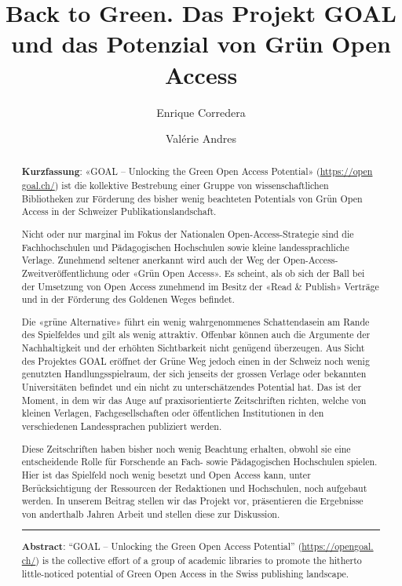 \documentclass[a4paper,
fontsize=11pt,
oneside,
numbers=noperiodatend,
parskip=half-,
bibliography=totoc,
final
]{scrartcl}
\title{\LARGE{Back to Green. Das Projekt GOAL und das Potenzial von Grün Open Access}}%
\author{Enrique Corredera \and Valérie Andres} %
\date{}
\begin{document}
\maketitle
\thispagestyle{fancyplain} 

\begin{abstract}
\noindent
\textbf{Kurzfassung}: «GOAL -- Unlocking the Green Open Access
Potential» (\href{https://opengoal.ch/}{https://open goal.ch/}) ist die kollektive Bestrebung
einer Gruppe von wissenschaftlichen Bibliotheken zur Förderung des
bisher wenig beachteten Potentials von Grün Open Access in der Schweizer
Publikationslandschaft. 

Nicht oder nur marginal im Fokus der Nationalen
Open-Access-Strategie sind die Fachhochschulen und Pädagogischen
Hochschulen sowie kleine landessprachliche Verlage. Zunehmend seltener
anerkannt wird auch der Weg der Open-Access-Zweitveröffentlichung oder
«Grün Open Access». Es scheint, als ob sich der Ball bei der Umsetzung
von Open Access zunehmend im Besitz der «Read \& Publish» Verträge und
in der Förderung des Goldenen Weges befindet. 

Die «grüne Alternative»
führt ein wenig wahrgenommenes Schattendasein am Rande des Spielfeldes
und gilt als wenig attraktiv. Offenbar können auch die Argumente der
Nachhaltigkeit und der erhöhten Sichtbarkeit nicht genügend überzeugen.
Aus Sicht des Projektes GOAL eröffnet der Grüne Weg jedoch einen in der
Schweiz noch wenig genutzten Handlungsspielraum, der sich jenseits der
grossen Verlage oder bekannten Universitäten befindet und ein nicht zu
unterschätzendes Potential hat. Das ist der Moment, in dem wir das Auge
auf praxisorientierte Zeitschriften richten, welche von kleinen
Verlagen, Fachgesellschaften oder öffentlichen Institutionen in den
verschiedenen Landessprachen publiziert werden. 

Diese Zeitschriften
haben bisher noch wenig Beachtung erhalten, obwohl sie eine
entscheidende Rolle für Forschende an Fach- sowie Pädagogischen
Hochschulen spielen. Hier ist das Spielfeld noch wenig besetzt und Open
Access kann, unter Berücksichtigung der Ressourcen der Redaktionen und
Hochschulen, noch aufgebaut werden. In unserem Beitrag stellen wir das
Projekt vor, präsentieren die Ergebnisse von anderthalb Jahren Arbeit
und stellen diese zur Diskussion.

\begin{center}\rule{0.5\linewidth}{0.5pt}\end{center}

\noindent \textbf{Abstract}: \enquote{GOAL -- Unlocking the Green Open Access Potential}
(\href{https://opengoal.ch/}{https://opengoal. ch/}) is the collective effort of a group of
academic libraries to promote the hitherto little-noticed potential of
Green Open Access in the Swiss publishing landscape. 


\end{abstract}
\end{document}

